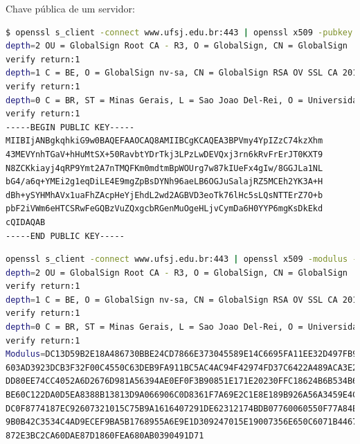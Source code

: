 \begin{frame}
Chave pública de um servidor:
\begin{lstlisting}[language=bash, label=lst-ufsj-key, caption={Visualizando a chave pública da UFSJ (armored ASCII).}, postbreak=\mbox{$\hookrightarrow$\space}, basicstyle=\fontsize{8}{10}\selectfont\ttfamily]
$ openssl s_client -connect www.ufsj.edu.br:443 | openssl x509 -pubkey -noout
depth=2 OU = GlobalSign Root CA - R3, O = GlobalSign, CN = GlobalSign
verify return:1
depth=1 C = BE, O = GlobalSign nv-sa, CN = GlobalSign RSA OV SSL CA 2018
verify return:1
depth=0 C = BR, ST = Minas Gerais, L = Sao Joao Del-Rei, O = Universidade Federal de Sao Joao Del-Rei - UFSJ, CN = ufsj.edu.br
verify return:1
-----BEGIN PUBLIC KEY-----
MIIBIjANBgkqhkiG9w0BAQEFAAOCAQ8AMIIBCgKCAQEA3BPVmy4YpIZzC74kzXhm
43MEVYnhTGaV+hHuMtSX+50RavbtYDrTkj3LPzLwDEVQxj3rn6kRvFrErJT0KXT9
N8ZCKkiayj4qRP9Ymt2A7nTMQFKm0mdtmBpWOUrg7w87kIUeFx4gIw/8GGJLa1NL
bG4/a6q+YMEi2g1eqDiLE4E9mgZpBsDYNh96aeLB6OGJuSalajRZ5MCEh2YK3A+H
dBh+ySYHMhAVx1uaFhZAcpHeYjEhdL2wd2AGBVD3eoTk76lHc5sLQsNTTErZ7O+b
pbF2iVWm6eHTCSRwFeGQBzVuZQxgcbRGenMuOgeHLjvCymDa6H0YYP6mgKsDkEkd
cQIDAQAB
-----END PUBLIC KEY-----
\end{lstlisting}

\framebreak

\begin{lstlisting}[language=bash, label=lst-ufsj-key-hex, caption={Visualizando a chave pública da UFSJ em hex.}, postbreak=\mbox{$\hookrightarrow$\space}, basicstyle=\fontsize{8}{10}\selectfont\ttfamily]
openssl s_client -connect www.ufsj.edu.br:443 | openssl x509 -modulus -noout 
depth=2 OU = GlobalSign Root CA - R3, O = GlobalSign, CN = GlobalSign
verify return:1
depth=1 C = BE, O = GlobalSign nv-sa, CN = GlobalSign RSA OV SSL CA 2018
verify return:1
depth=0 C = BR, ST = Minas Gerais, L = Sao Joao Del-Rei, O = Universidade Federal de Sao Joao Del-Rei - UFSJ, CN = ufsj.edu.br
verify return:1
Modulus=DC13D59B2E18A486730BBE24CD7866E373045589E14C6695FA11EE32D497FB9D116AF6ED
603AD3923DCB3F32F00C4550C63DEB9FA911BC5AC4AC94F42974FD37C6422A489ACA3E2A44FF589A
DD80EE74CC4052A6D2676D981A56394AE0EF0F3B90851E171E20230FFC18624B6B534B6C6E3F6BAA
BE60C122DA0D5EA8388B13813D9A066906C0D8361F7A69E2C1E8E189B926A56A3459E4C08487660A
DC0F8774187EC92607321015C75B9A1616407291DE62312174BDB07760060550F77A84E4EFA94773
9B0B42C3534C4AD9ECEF9BA5B1768955A6E9E1D309247015E19007356E650C6071B4467A732E3A07
872E3BC2CA60DAE87D1860FEA680AB0390491D71
\end{lstlisting}

\end{frame}




